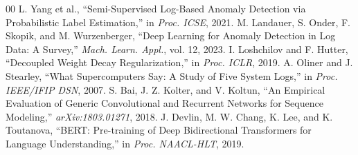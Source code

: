 \documentclass[conference]{IEEEtran}
\begin{document}
\begin{thebibliography}{00}
 L. Yang et al., ``Semi-Supervised Log-Based Anomaly Detection via Probabilistic Label Estimation,'' in \textit{Proc. ICSE}, 2021.
 M. Landauer, S. Onder, F. Skopik, and M. Wurzenberger, ``Deep Learning for Anomaly Detection in Log Data: A Survey,'' \textit{Mach. Learn. Appl.}, vol. 12, 2023.
 I. Loshchilov and F. Hutter, ``Decoupled Weight Decay Regularization,'' in \textit{Proc. ICLR}, 2019.
 A. Oliner and J. Stearley, ``What Supercomputers Say: A Study of Five System Logs,'' in \textit{Proc. IEEE/IFIP DSN}, 2007.
 S. Bai, J. Z. Kolter, and V. Koltun, ``An Empirical Evaluation of Generic Convolutional and Recurrent Networks for Sequence Modeling,'' \textit{arXiv:1803.01271}, 2018.
 J. Devlin, M. W. Chang, K. Lee, and K. Toutanova, ``BERT: Pre-training of Deep Bidirectional Transformers for Language Understanding,'' in \textit{Proc. NAACL-HLT}, 2019.
\end{thebibliography}
\end{document}
